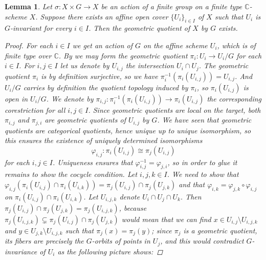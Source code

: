 \documentclass[12pt,a4paper]{amsart}
\theoremstyle{plain}
\newtheorem{lm}[thm]{Lemma}
\theoremstyle{definition}
\theoremstyle{remark}
\begin{document}
\begin{lm}\label{lm:affinecover}
  Let $\sigma \colon X \times G \to X$ be an action of a finite group on a finite type $\mathbb{C}$-scheme $X$.
  Suppose there exists an affine open cover $\{ U_{i} \}_{i \in I}$ of $X$ such that $U_{i}$ is $G$-invariant for every $i \in I$.
  Then the geometric quotient of $X$ by $G$ exists.

  \begin{proof}
    For each $i \in I$ we get an action of $G$ on the affine scheme $U_{i}$, which is of finite type over $\mathbb{C}$.
    By  we may form the geometric quotient $\pi_{i} \colon U_{i} \to U_{i}/G$ for each $i \in I$.
    For $i, j \in I$ let us denote by $U_{i,j}$ the intersection $U_{i} \cap U_{j}$.
    The geometric quotient $\pi_{i}$ is by definition surjective, so we have $\pi_{i}^{-1}(\pi_{i}(U_{i,j})) = U_{i,j}$.
    And $U_{i}/G$ carries by definition the quotient topology induced by $\pi_{i}$, so $\pi_{i}(U_{i,j})$ is open in $U_{i}/G$.
    We denote by $\pi_{i,j} \colon \pi_{i}^{-1}(\pi_{i}(U_{i,j})) \to \pi_{i}(U_{i,j})$ the corresponding corestriction for all $i, j \in I$.
    Since geometric quotients are local on the target, both $\pi_{i,j}$ and $\pi_{j,i}$ are geometric quotients of $U_{i,j}$ by $G$.
    We have seen that geometric quotients are categorical quotients, hence unique up to unique isomorphism, so this ensures the existence of uniquely determined isomorphisms
    \[ \varphi_{i,j} \colon \pi_{i}(U_{i,j}) \cong \pi_{j}(U_{i,j}) \]
    for each $i, j \in I$.
    Uniqueness ensures that $\varphi_{i,j}^{-1} = \varphi_{j,i}$, so in order to glue it remains to show the cocycle condition.
    Let $i, j, k \in I$.
    We need to show that $\varphi_{i,j}(\pi_{i}(U_{i,j})\cap \pi_{i}(U_{i,k})) = \pi_{j}(U_{i,j}) \cap \pi_{j}(U_{j,k})$ and that $\varphi_{i,k} = \varphi_{j,k} \circ \varphi_{i,j}$ on $\pi_{i}(U_{i,j}) \cap \pi_{i}(U_{i,k})$.
    Let $U_{i,j,k}$ denote $U_{i} \cap U_{j} \cap U_{k}$.
    Then $\pi_{j}(U_{i,j}) \cap \pi_{j}(U_{j,k}) = \pi_{j}(U_{i,j,k})$, because $\pi_{j}(U_{i,j,k}) \subsetneq \pi_{j}(U_{i,j}) \cap \pi_{j}(U_{j,k})$ would mean that we can find $x \in U_{i,j} \setminus U_{i,j,k}$ and $y \in U_{j,k} \setminus U_{i,j,k}$ such that $\pi_{j}(x) = \pi_{j}(y)$; since $\pi_{j}$ is a geometric quotient, its fibers are precisely the $G$-orbits of points in $U_{j}$, and this would contradict $G$-invariance of $U_{i}$ as the following picture shows:


\end{proof}
\end{lm}
\end{document}
